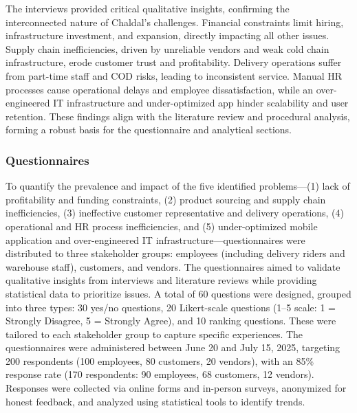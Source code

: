 \documentclass[12pt,a4paper]{article}
\begin{document}
The interviews provided critical qualitative insights, confirming the interconnected nature of Chaldal’s challenges. Financial constraints limit hiring, infrastructure investment, and expansion, directly impacting all other issues. Supply chain inefficiencies, driven by unreliable vendors and weak cold chain infrastructure, erode customer trust and profitability. Delivery operations suffer from part-time staff and COD risks, leading to inconsistent service. Manual HR processes cause operational delays and employee dissatisfaction, while an over-engineered IT infrastructure and under-optimized app hinder scalability and user retention. These findings align with the literature review and procedural analysis, forming a robust basis for the questionnaire and analytical sections.


\subsubsection{Questionnaires}
To quantify the prevalence and impact of the five identified problems—(1) lack of profitability and funding constraints, (2) product sourcing and supply chain inefficiencies, (3) ineffective customer representative and delivery operations, (4) operational and HR process inefficiencies, and (5) under-optimized mobile application and over-engineered IT infrastructure—questionnaires were distributed to three stakeholder groups: employees (including delivery riders and warehouse staff), customers, and vendors. The questionnaires aimed to validate qualitative insights from interviews and literature reviews while providing statistical data to prioritize issues. A total of 60 questions were designed, grouped into three types: 30 yes/no questions, 20 Likert-scale questions (1–5 scale: 1 = Strongly Disagree, 5 = Strongly Agree), and 10 ranking questions. These were tailored to each stakeholder group to capture specific experiences. The questionnaires were administered between June 20 and July 15, 2025, targeting 200 respondents (100 employees, 80 customers, 20 vendors), with an 85\% response rate (170 respondents: 90 employees, 68 customers, 12 vendors). Responses were collected via online forms and in-person surveys, anonymized for honest feedback, and analyzed using statistical tools to identify trends.
\end{document}

